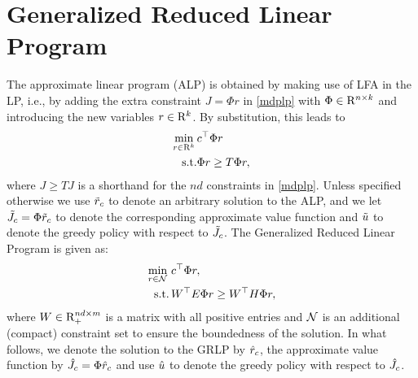 \section{Generalized Reduced Linear Program}
The approximate linear program (ALP) is obtained by making use of LFA in the LP, i.e., by adding the extra constraint $J=\Phi r$ in \eqref{mdplp} with $\Phi \in \mathrm{R}^{n\times k}$ and introducing the new variables $r\in \mathrm{R}^k$. By substitution, this leads to
\begin{align}\label{alp}
\begin{split}
\min_{r\in \R^k}\, &c^\top \Phi r\\
\text{s.t.}\mb &\Phi r\geq T \Phi r,
\end{split}
\end{align}
where $J\geq TJ$ is a shorthand for the $nd$ constraints in \eqref{mdplp}. Unless specified otherwise we use $\tilde{r}_c$ to denote an arbitrary solution to the ALP, and we let $\tilde{J}_c=\Phi \tilde{r}_c$ to denote the corresponding approximate value function and $\tilde{u}$ to denote the greedy policy with respect to $\tilde{J}_c$.
The Generalized Reduced Linear Program is given as:
\begin{align}\label{grlp}
\begin{split}
\underset{r\in \N}{\min}\, &\, c^\top \Phi r,\\
\text{s.t.}\mb & \,W^\top E\Phi r\geq W^\top H \Phi r,
\end{split}
\end{align}
where $W \in \mathrm{R}^{nd\times m}_+$ is a matrix with all positive entries and $\mathcal{N}$ is an additional (compact) constraint set to ensure the boundedness of the solution.
In what follows, we denote the solution to the GRLP by $\hat{r}_c$, the approximate value function by $\hat{J}_c=\Phi \hat{r}_c$ and use $\hat{u}$ to denote the greedy policy with respect to $\hat{J}_c$.

